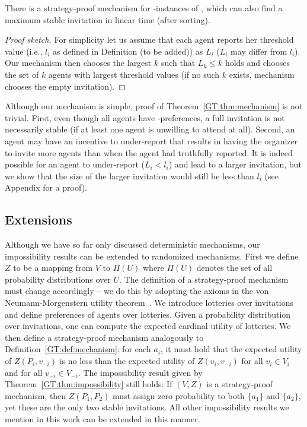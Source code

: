 \begin{theorem} \label{GT:thm:mechanism}
	There is a strategy-proof mechanism for \INC-instances of \ASIP, which can also find a maximum stable invitation in linear time (after sorting). 
\end{theorem}
\begin{proof}[Proof sketch]
For simplicity let us assume that each agent reports her threshold value (i.e., $l_i$ as defined in Definition (to be added)) as $L_i$ ($L_i$ may differ from $l_i$). 
Our mechanism then chooses the largest $k$ such that $L_k \leq k$ holds and chooses the set of $k$ agents with largest threshold values (if no such $k$ exists, mechanism chooses the empty invitation). 
\end{proof}
	Although our mechanism is simple, proof of Theorem~\ref{GT:thm:mechanism} is not trivial. First, even though all agents have \INC-preferences, a full invitation is not necessarily stable (if at least one agent is unwilling to attend at all). Second, an agent may have an incentive to under-report that results in having the organizer to invite more agents than when the agent had truthfully reported. It is indeed possible for an agent to under-report ($L_i < l_i$) and lead to a larger invitation, but we show that the size of the larger invitation would still be less than $l_i$ (see Appendix for a proof). 


\subsection{Extensions}\label{GT:sec:asip_extension}
Although we have so far only discussed deterministic mechanisms, our impossibility results can be extended to randomized mechanisms. First we define $Z$ to be a mapping from $V$ to $\Pi(U)$ where $\Pi(U)$ denotes the set of all probability distributions over $U$. The definition of a strategy-proof mechanism must change accordingly -- we do this by adopting the axioms in the von Neumann-Morgenstern utility theorem~\cite{von1947theory}. We introduce lotteries over invitations and define preferences of agents over lotteries. Given a probability distribution over invitations, one can compute the expected cardinal utility of lotteries. We then define a strategy-proof mechanism analogously to Definition~\ref{GT:def:mechanism}: for each $a_i$, it must hold that the expected utility of $Z(P_i, v_{-i})$ is no less than the expected utility of $Z(v_i, v_{-i})$ for all $v_i\in V_i$ and for all $v_{-i} \in V_{-i}$. The impossibility result given by Theorem~\ref{GT:thm:impossibility} still holds: If $(V, Z)$ is a strategy-proof mechanism, then $Z(P_1, P_2)$ must assign zero probability to both $\{a_1\}$ and $\{a_2\}$, yet these are the only two stable invitations.  All other impossibility results we mention in this work can be extended in this manner.

